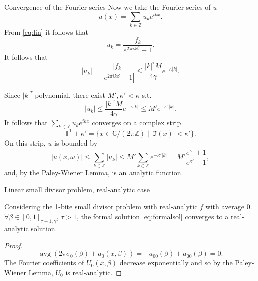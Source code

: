 \documentclass[]{beamer}
\newcommand{\be}{\beta}
\newcommand{\g}{\gamma}
\newcommand{\om}{\omega}
\newcommand{\T}{\mathbb{T}}
\begin{document}
\begin{frame}{Convergence of the Fourier series}
    Now we take the Fourier series of $u$
    \begin{equation*}
        u(x) = \sum_{k \in \mathbb{Z}} u_k e^{i k x}.
    \end{equation*}
    From \eqref{eq:lin} it follows that
    \begin{equation*}
        u_k = \frac{f_k}{e^{2\pi i k \be} - 1}.
    \end{equation*}
    \pause
    It follows that
    \begin{equation*}
        |u_k| = \frac{|f_k|}{|e^{2\pi i k \be} - 1|} 
            \le \frac{|k|^\tau M}{4 \g} e^{-\kappa |k|}.
    \end{equation*}
\end{frame}

\begin{frame}
    Since $|k|^\tau$ polynomial, there exist $M', \kappa' < \kappa$
    s.t.
    \begin{equation*}\label{eq:ukbound}
        |u_k| 
            \le \frac{|k|^\tau M}{4 \g} e^{-\kappa |k|}
        \le
            M' e^{- \kappa' |k|}.
    \end{equation*}
    \pause
    It follows that $\sum_{k \in \mathbb{Z}} u_k e^{ikx}$ converges
    on a complex strip 
    \begin{equation*}
        \T^1 + \kappa' = \{ x \in \mathbb{C}/(2 \pi \mathbb{Z}) \mid |\Im(x)| < \kappa' \}.
    \end{equation*}
    \pause
    On this strip, $u$ is bounded by
    \begin{equation*}
        |u(x,\om)| \le \sum_{k \in \mathbb{Z}} | u_k | 
        \le M' \sum_{k \in \mathbb{Z}}  e^{-\kappa' |k|}
        = M' \frac{e^{\kappa'} + 1}{e^{\kappa'} - 1},
    \end{equation*}
    and, by the Paley-Wiener Lemma, is an analytic function.
\end{frame}

\begin{frame}{Linear small divisor problem, real-analytic case}
    \begin{theorem}
        Considering the 1-bite small divisor problem with real-analytic 
        $f$ with average $0$. $\forall \be \in [0,1]_{\tau +1, \g}$, $\tau > 1$,
        the formal solution \eqref{eq:formalsol} converges to
        a real-analytic solution.
    \end{theorem}
    \begin{proof}
        \begin{equation*}
            \operatorname{avg}(2 \pi \sigma_0(\be) + a_0(x,\be)) = - a_{00}(\be) + a_{00}(\be) = 0.
        \end{equation*}
        The Fourier coefficients of $U_0(x, \be)$ decrease exponentially and so by
        the Paley-Wiener Lemma, $U_0$ is real-analytic.
    \end{proof}
\end{frame}
\end{document}
